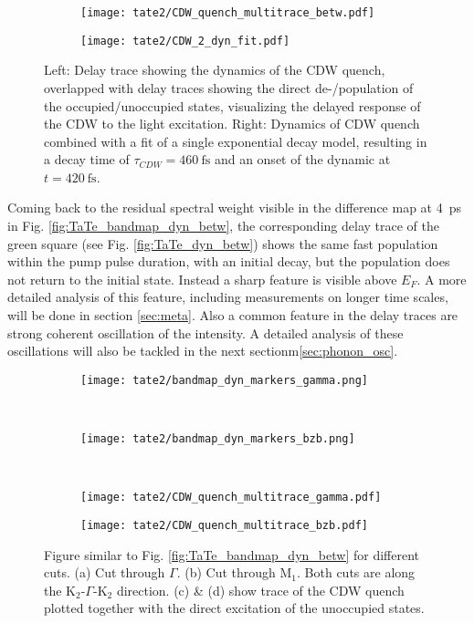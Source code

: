 \begin{figure}[t!]
	\centering
	\begin{subfigure}[b]{0.33\textwidth}
		\texttt{[image: tate2/CDW\_quench\_multitrace\_betw.pdf]}
		\caption{}
	\end{subfigure}
	\begin{subfigure}[b]{0.33\textwidth}
		\texttt{[image: tate2/CDW\_2\_dyn\_fit.pdf]}
		\caption{}
	\end{subfigure}
	\caption{Left: Delay trace showing the dynamics of the CDW quench, overlapped with delay traces showing the direct de-/population of the occupied/unoccupied states, visualizing the delayed response of the CDW to the light excitation. Right: Dynamics of CDW quench combined with a fit of a single exponential decay model, resulting in a decay time of $\tau_{CDW}=\qty{460}{\femto\second}$ and an onset of the dynamic at $t=\qty{420}{\femto\second}$.}
	\label{fig:TaTe_CDW_comp}
\end{figure}

Coming back to the residual spectral weight visible in the difference map at \qty{4}{\pico\second} in Fig. \ref{fig:TaTe_bandmap_dyn_betw}, the corresponding delay trace of the green square (see Fig. \ref{fig:TaTe_dyn_betw}) shows the same fast population within the pump pulse duration, with an initial decay, but the population does not return to the initial state.
Instead a sharp feature is visible above $E_F$.
A more detailed analysis of this feature, including measurements on longer time scales, will be done in section \ref{sec:meta}.
Also a common feature in the delay traces are strong coherent oscillation of the intensity.
A detailed analysis of these oscillations will also be tackled in the next sectionm\ref{sec:phonon_osc}.

\begin{figure}[t!]
	\centering
	\begin{subfigure}[b]{\textwidth}
		\texttt{[image: tate2/bandmap\_dyn\_markers\_gamma.png]}
		\caption{}
	\end{subfigure}
	\\
	\centering
	\begin{subfigure}[b]{\textwidth}
		\texttt{[image: tate2/bandmap\_dyn\_markers\_bzb.png]}
		\caption{}
	\end{subfigure}
	\\
	\begin{subfigure}[b]{0.33\textwidth}
		\texttt{[image: tate2/CDW\_quench\_multitrace\_gamma.pdf]}
		\caption{}
	\end{subfigure}
	\begin{subfigure}[b]{0.33\textwidth}
		\texttt{[image: tate2/CDW\_quench\_multitrace\_bzb.pdf]}
		\caption{}
	\end{subfigure}
	\caption{Figure similar to Fig. \ref{fig:TaTe_bandmap_dyn_betw} for different cuts. (a) Cut through $\Gamma$. (b) Cut through M$_1$. Both cuts are along the K$_2$-$\Gamma$-K$_2$ direction. (c) \& (d) show trace of the CDW quench plotted together with the direct excitation of the unoccupied states.}
	\label{fig:TaTe_bandmap_dyn_bzb}
\end{figure}

